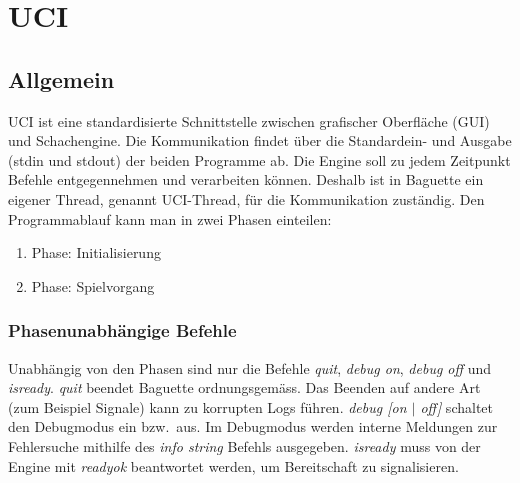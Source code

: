 \def \citeuci[#1]{\cite[l. #1]{uci}}
\section{UCI}\label{sec:uci}
\subsection{Allgemein}\label{subsec:allgemein}
UCI ist eine standardisierte Schnittstelle zwischen grafischer Oberfl\"ache (GUI) und Schachengine.
Die Kommunikation findet \"uber die Standardein- und Ausgabe (stdin und stdout) der beiden Programme ab.\citeuci[9]
\newline
Die Engine soll zu jedem Zeitpunkt Befehle entgegennehmen und verarbeiten k\"onnen.\citeuci[15]
Deshalb ist in Baguette ein eigener Thread, genannt UCI-Thread, f\"ur die Kommunikation zust\"andig.
\newline
Den Programmablauf kann man in zwei Phasen einteilen:
\begin{enumerate}
    \item Phase: Initialisierung
    \item Phase: Spielvorgang
\end{enumerate}
\subsubsection{Phasenunabh\"angige Befehle}
Unabh\"angig von den Phasen sind nur die Befehle \textit{quit}, \textit{debug on}, \textit{debug off} und \textit{isready}.
\newline\textit{quit} beendet Baguette ordnungsgem\"ass.
Das Beenden auf andere Art (zum Beispiel Signale) kann zu korrupten Logs f\"uhren.
\newline \textit{debug [on $|$ off]} schaltet den Debugmodus ein bzw.\  aus.
Im Debugmodus werden interne Meldungen zur Fehlersuche mithilfe des \textit{info string} Befehls ausgegeben.
\newline \textit{isready} muss von der Engine mit \textit{readyok} beantwortet werden, um Bereitschaft zu signalisieren.
